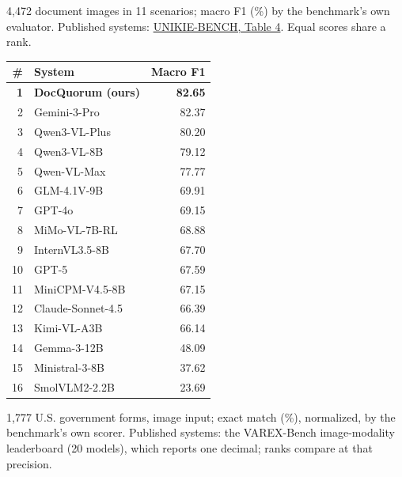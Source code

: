 \label{results:unikie}
4,472 document images in 11 scenarios; macro F1 (\%) by the benchmark's own evaluator. Published systems: \href{https://arxiv.org/html/2602.07038v2#S4.T4}{UNIKIE-BENCH, Table 4}. Equal scores share a rank.

\begingroup\small\setlength{\tabcolsep}{4pt}
\begin{tabularx}{0.62\linewidth}{@{}rYr@{}}\toprule
\# & System & Macro F1\\
\midrule
{} \textbf{1} & \textbf{DocQuorum (ours)} & \textbf{82.65}\\
2 & Gemini-3-Pro & 82.37\\
3 & Qwen3-VL-Plus & 80.20\\
4 & Qwen3-VL-8B & 79.12\\
5 & Qwen-VL-Max & 77.77\\
6 & GLM-4.1V-9B & 69.91\\
7 & GPT-4o & 69.15\\
8 & MiMo-VL-7B-RL & 68.88\\
9 & InternVL3.5-8B & 67.70\\
10 & GPT-5 & 67.59\\
11 & MiniCPM-V4.5-8B & 67.15\\
12 & Claude-Sonnet-4.5 & 66.39\\
13 & Kimi-VL-A3B & 66.14\\
14 & Gemma-3-12B & 48.09\\
15 & Ministral-3-8B & 37.62\\
16 & SmolVLM2-2.2B & 23.69\\
\bottomrule\end{tabularx}\endgroup
{}
1,777 U.S. government forms, image input; exact match (\%), normalized, by the benchmark's own scorer. Published systems: the VAREX-Bench image-modality leaderboard (20 models), which reports one decimal; ranks compare at that precision.

